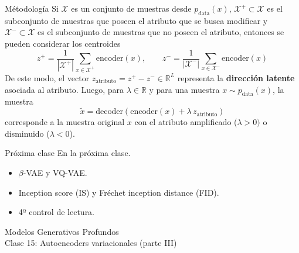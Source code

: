 \documentclass{beamer}
\newcommand{\R}{\mathbb{R}}
\begin{document}
\begin{frame}{Métodología}
    Si $\mathcal{X}$ es un conjunto de muestras desde $p_\text{data}(x)$, $\mathcal{X}^+\subset\mathcal{X}$ es el subconjunto de muestras que poseen el atributo que se busca modificar y $\mathcal{X}^-\subset\mathcal{X}$ es el subconjunto de muestras que no poseen el atributo, entonces se pueden considerar los centroides
    \begin{equation*}
        z^+=\frac{1}{|\mathcal{X}^+|}\sum_{x\in\mathcal{X}^+} \text{encoder}(x),
        \qquad
        z^-=\frac{1}{|\mathcal{X}^-|}\sum_{x\in\mathcal{X}^-} \text{encoder}(x)
    \end{equation*}
    De este modo, el vector $z_{\text{atributo}}=z^+-z^-\in\R^L$ representa la \textbf{dirección latente} asociada al atributo. Luego, para $\lambda\in\R$ y para una muestra $x\sim p_\text{data}(x)$, la muestra
    \begin{equation*}
        \tilde x = \text{decoder}(\text{encoder}(x)+\lambda\, z_\text{atributo})
    \end{equation*}
    corresponde a la muestra original $x$ con el atributo amplificado ($\lambda>0)$ o disminuido ($\lambda<0$).
\end{frame}

\begin{frame}{Próxima clase}
    En la próxima clase.
    \begin{itemize}
        \item $\beta$-VAE y VQ-VAE.
        \item Inception score (IS) y Fréchet inception distance (FID).
        \item 4º control de lectura.
    \end{itemize}
\end{frame}

\begin{frame}
    \centering
    \Large{Modelos Generativos Profundos}\\
    \large{Clase 15: Autoencoders variacionales (parte III)}
\end{frame}
\end{document}
